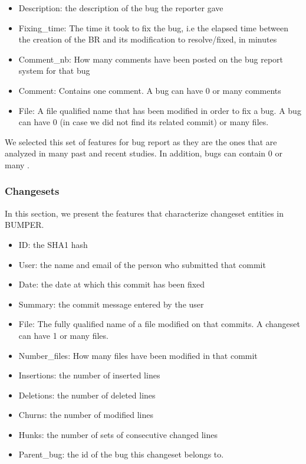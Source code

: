 \begin{itemize}
\item Description: the description of the bug the reporter gave
\item Fixing\_time: The time it took to fix the bug, i.e the elapsed time between the creation of the BR and its modification to resolve/fixed, in minutes
\item Comment\_nb: How many comments have been posted on the bug report system for that bug
\item Comment: Contains one comment. A bug can have 0 or many comments
\item File: A file qualified name that has been modified in order to fix a bug. A bug can have 0 (in case we did not find its related commit) or many files.

\end{itemize}

We selected this set of features for bug report as they are the ones that are analyzed in many past and recent studies. In addition, bugs can contain 0 or many .

\subsubsection{Changesets}

In this section, we present the features that characterize changeset entities in BUMPER.

\begin{itemize}

\item ID: the SHA1 hash
\item User: the name and email of the person who submitted that commit
\item Date: the date at which this commit has been fixed
\item Summary: the commit message entered by the user
\item File: The fully qualified name of a file modified on that commits. A changeset can have 1 or many files.
\item Number\_files: How many files have been modified in that commit
\item Insertions: the number of inserted lines
\item Deletions: the number of deleted lines
\item Churns: the number of modified lines
\item Hunks: the number of sets of consecutive changed lines
\item Parent\_bug: the id of the bug this changeset belongs to.

\end{itemize}

